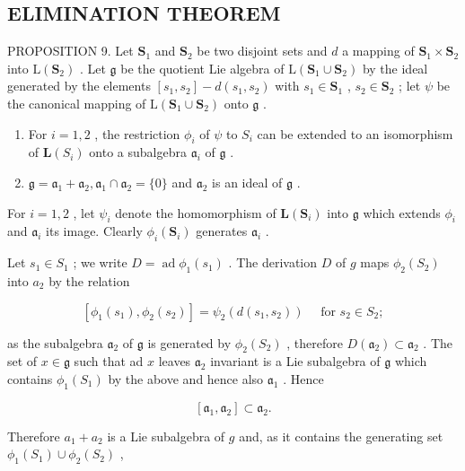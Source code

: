 \subsection{ELIMINATION THEOREM}

PROPOSITION 9. Let \(\mathbf{S}_1\) and \(\mathbf{S}_2\) be two disjoint sets and \(d\) a mapping of \(\mathbf{S}_1 \times \mathbf{S}_2\) into \(\mathrm{L}(\mathbf{S}_2)\) . Let \(\mathfrak{g}\) be the quotient Lie algebra of \(\mathrm{L}(\mathbf{S}_1 \cup \mathbf{S}_2)\) by the ideal generated by the elements \([s_1, s_2] - d(s_1, s_2)\) with \(s_1 \in \mathbf{S}_1\) , \(s_2 \in \mathbf{S}_2\) ; let \(\psi\) be the canonical mapping of \(\mathrm{L}(\mathbf{S}_1 \cup \mathbf{S}_2)\) onto \(\mathfrak{g}\) .

\begin{enumerate}
\def\labelenumi{(\alph{enumi})}
\item
  For \(i = 1,2\) , the restriction \(\phi_{i}\) of \(\psi\) to \(S_{i}\) can be extended to an isomorphism of \(\mathbf{L}(S_i)\) onto a subalgebra \(\mathfrak{a}_i\) of \(\mathfrak{g}\) .
\item
  \(\mathfrak{g} = \mathfrak{a}_1 + \mathfrak{a}_2, \mathfrak{a}_1 \cap \mathfrak{a}_2 = \{0\}\) and \(\mathfrak{a}_2\) is an ideal of \(\mathfrak{g}\) .
\end{enumerate}

For \(i = 1,2\) , let \(\psi_{i}\) denote the homomorphism of \(\mathbf{L}(\mathbf{S}_i)\) into \(\mathfrak{g}\) which extends \(\phi_i\) and \(\mathfrak{a}_i\) its image. Clearly \(\phi_i(\mathbf{S}_i)\) generates \(\mathfrak{a}_i\) .

Let \(s_1 \in S_1\) ; we write \(D = \operatorname{ad} \phi_1(s_1)\) . The derivation \(D\) of \(g\) maps \(\phi_2(S_2)\) into \(a_2\) by the relation

\[
[ \phi_ {1} (s _ {1}), \phi_ {2} (s _ {2}) ] = \psi_ {2} (d (s _ {1}, s _ {2})) \quad \text { for } s _ {2} \in S _ {2};
\]

as the subalgebra \(\mathfrak{a}_2\) of \(\mathfrak{g}\) is generated by \(\phi_2(S_2)\) , therefore \(D(\mathfrak{a}_2) \subset \mathfrak{a}_2\) . The set of \(x \in \mathfrak{g}\) such that ad \(x\) leaves \(\mathfrak{a}_2\) invariant is a Lie subalgebra of \(\mathfrak{g}\) which contains \(\phi_1(S_1)\) by the above and hence also \(\mathfrak{a}_1\) . Hence

\[
\left[ \mathfrak {a} _ {1}, \mathfrak {a} _ {2} \right] \subset \mathfrak {a} _ {2}.\tag{23}
\]

Therefore \(a_1 + a_2\) is a Lie subalgebra of \(g\) and, as it contains the generating set \(\phi_1(S_1) \cup \phi_2(S_2)\) ,

